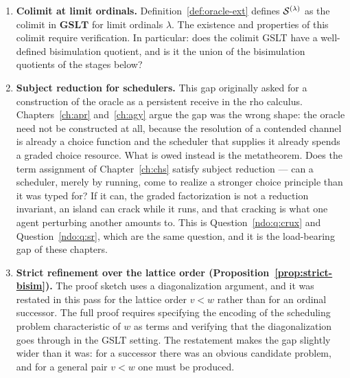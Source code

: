 \begin{enumerate}[label=\textbf{Gap \arabic*.}, leftmargin=*, itemsep=8pt]

  \item \textbf{Colimit at limit ordinals.}
        Definition~\ref{def:oracle-ext} defines $\mathcal{S}^{(\lambda)}$ as the
        colimit in $\mathbf{GSLT}$ for limit ordinals $\lambda$.
        The existence and properties of this colimit require
        verification.
        In particular: does the colimit GSLT have a well-defined
        bisimulation quotient, and is it the union of the bisimulation
        quotients of the stages below?

  \item \textbf{Subject reduction for schedulers.}
        This gap originally asked for a construction of the oracle as a
        persistent receive in the rho calculus.
        Chapters~\ref{ch:apr} and~\ref{ch:agy} argue the gap was the
        wrong shape: the oracle need not be constructed at all, because
        the resolution of a contended channel is already a choice
        function and the scheduler that supplies it already spends a
        graded choice resource.
        What is owed instead is the metatheorem.
        Does the term assignment of Chapter~\ref{ch:chs} satisfy subject
        reduction --- can a scheduler, merely by running, come to realize
        a stronger choice principle than it was typed for?
        If it can, the graded factorization is not a reduction invariant,
        an island can crack while it runs, and that cracking is what one
        agent perturbing another amounts to.
        This is Question~\ref{ndo:q:crux} and Question~\ref{ndo:q:sr},
        which are the same question, and it is the load-bearing gap of
        these chapters.

  \item \textbf{Strict refinement over the lattice order
        (Proposition~\ref{prop:strict-bisim}).}
        The proof sketch uses a diagonalization argument, and it was
        restated in this pass for the lattice order $v < w$ rather than
        for an ordinal successor.
        The full proof requires specifying the encoding of the
        scheduling problem characteristic of $w$ as terms and verifying
        that the diagonalization goes through in the GSLT setting.
        The restatement makes the gap slightly wider than it was: for a
        successor there was an obvious candidate problem, and for a
        general pair $v < w$ one must be produced.


\end{enumerate}
